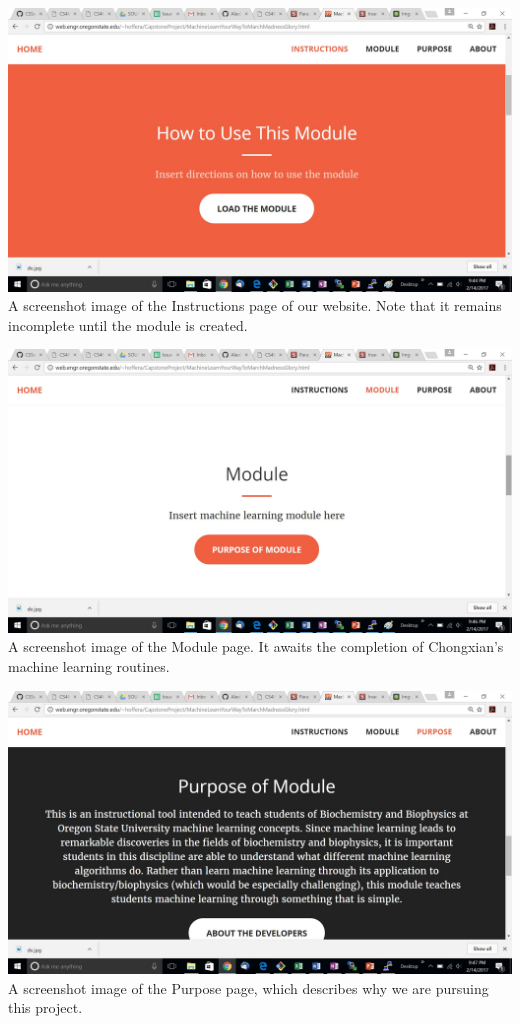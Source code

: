 \documentclass[letterpaper, 10pt,titlepage]{article}
\begin{document}
\includegraphics[width=\textwidth]{Instructions.jpg}
A screenshot image of the Instructions page of our website. Note that it remains incomplete until the module is created.

\includegraphics[width=\textwidth]{Module.jpg}
A screenshot image of the Module page. It awaits the completion of Chongxian's machine learning routines.

\includegraphics[width=\textwidth]{Purpose.jpg}
A screenshot image of the Purpose page, which describes why we are pursuing this project.
\end{document}
